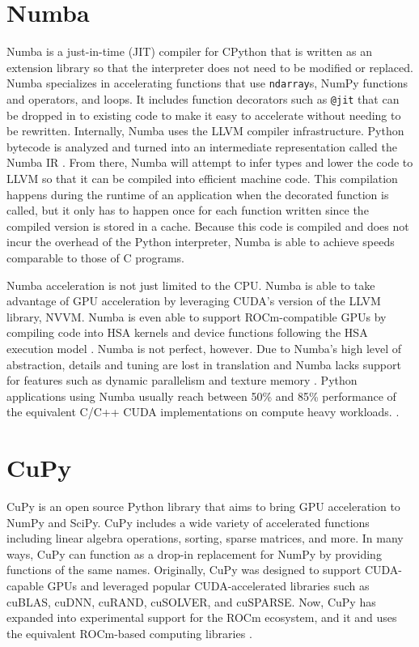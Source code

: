 \section{Numba}

Numba is a just-in-time (JIT) compiler for CPython that is written as an extension library so that the interpreter does not need to be modified or replaced. Numba specializes in accelerating functions that use \verb|ndarray|s, NumPy functions and operators, and loops. It includes function decorators such as \verb|@jit| that can be dropped in to existing code to make it easy to accelerate without needing to be rewritten. Internally, Numba uses the LLVM compiler infrastructure. Python bytecode is analyzed and turned into an intermediate representation called the Numba IR \cite{lessonsLearned}. From there, Numba will attempt to infer types and lower the code to LLVM so that it can be compiled into efficient machine code. This compilation happens during the runtime of an application when the decorated function is called, but it only has to happen once for each function written since the compiled version is stored in a cache. Because this code is compiled and does not incur the overhead of the Python interpreter, Numba is able to achieve speeds comparable to those of C programs.  

\quad Numba acceleration is not just limited to the CPU. Numba is able to take advantage of GPU acceleration by leveraging CUDA's version of the LLVM library, NVVM. Numba is even able to support ROCm-compatible GPUs by compiling code into HSA kernels and device functions following the HSA execution model \cite{numbaRocm}. Numba is not perfect, however. Due to Numba's high level of abstraction, details and tuning are lost in translation and Numba lacks support for features such as dynamic parallelism and texture memory \cite{gpucomppy}. Python applications using Numba usually reach between 50\% and 85\% performance of the equivalent C/C++ CUDA implementations on compute heavy workloads. \cite{lessonsLearned}.

\section{CuPy}

CuPy is an open source Python library that aims to bring GPU acceleration to NumPy and SciPy. CuPy includes a wide variety of accelerated functions including linear algebra operations, sorting, sparse matrices, and more. In many ways, CuPy can function as a drop-in replacement for NumPy by providing functions of the same names. Originally, CuPy was designed to support CUDA-capable GPUs and leveraged popular CUDA-accelerated libraries such as cuBLAS, cuDNN, cuRAND, cuSOLVER, and cuSPARSE. Now, CuPy has expanded into experimental support for the ROCm ecosystem, and it and uses the equivalent ROCm-based computing libraries \cite{cupyRocm}.

